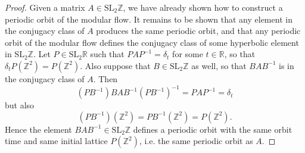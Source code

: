 \documentclass[12pt,twoside]{reedthesis}
\theoremstyle{definition}
\newcommand{\Z}{\mathbb{Z}}
\newcommand{\R}{\mathbb{R}}
\newcommand{\SLZ}{\mathrm{SL}_2{\Z}}
\newcommand{\SLR}{\mathrm{SL}_2{\R}}
\begin{document}
\begin{proof}
  Given a matrix $A \in \SLZ$, we have already shown how to construct a periodic orbit of the modular flow.
  It remains to be shown that any element in the conjugacy class of $A$ produces the same periodic orbit, and that any periodic orbit of the modular flow defines the conjugacy class of some hyperbolic element in $\SLZ$.
  Let $P \in \SLR$ such that $PAP^{-1} = \delta_t$ for some $t \in \R$, so that $\delta_t P(\Z^2) = P(\Z^2)$.
  Also suppose that $B \in \SLZ$ as well, so that $BAB^{-1}$ is in the conjugacy class of $A$.
  Then
  \begin{equation*}
    (PB^{-1}) BAB^{-1} (PB^{-1})^{-1} = PAP^{-1} = \delta_t
  \end{equation*}
  but also
  \begin{equation*}
    (PB^{-1})(\Z^2) = PB^{-1} (\Z^2) = P(\Z^2).
  \end{equation*}
  Hence the element $BAB^{-1} \in \SLZ$ defines a periodic orbit with the same orbit time and same initial lattice $P(\Z^2)$, i.e. the same periodic orbit as $A$.


\end{proof}
\end{document}
